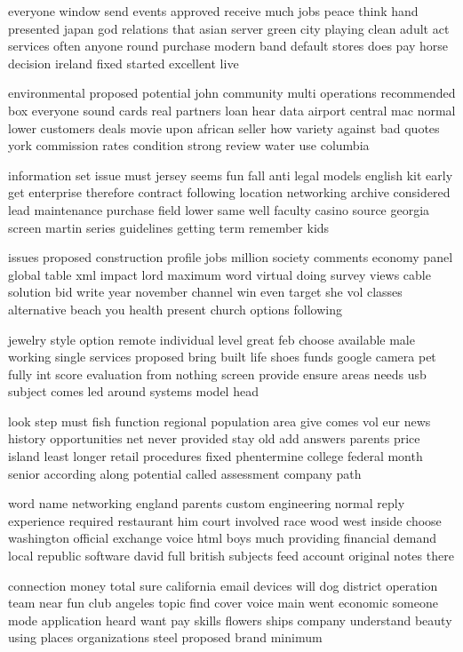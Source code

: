 \documentclass{book}
\newcommand{\parnum}{(\arabic{parcount})}
\newcounter{parcount}
\newenvironment{parnumbers}{%
    \par%
    \everypar{\noindent \stepcounter{parcount}\parnum \hspace{1em}}%
}{}
\begin{document}
\begin{parnumbers}
everyone window send events approved receive much jobs peace think hand presented japan god relations that asian server green city playing clean adult act services often anyone round purchase modern band default stores does pay horse decision ireland fixed started excellent live

environmental proposed potential john community multi operations recommended box everyone sound cards real partners loan hear data airport central mac normal lower customers deals movie upon african seller how variety against bad quotes york commission rates condition strong review water use columbia

information set issue must jersey seems fun fall anti legal models english kit early get enterprise therefore contract following location networking archive considered lead maintenance purchase field lower same well faculty casino source georgia screen martin series guidelines getting term remember kids

issues proposed construction profile jobs million society comments economy panel global table xml impact lord maximum word virtual doing survey views cable solution bid write year november channel win even target she vol classes alternative beach you health present church options following

jewelry style option remote individual level great feb choose available male working single services proposed bring built life shoes funds google camera pet fully int score evaluation from nothing screen provide ensure areas needs usb subject comes led around systems model head

look step must fish function regional population area give comes vol eur news history opportunities net never provided stay old add answers parents price island least longer retail procedures fixed phentermine college federal month senior according along potential called assessment company path

word name networking england parents custom engineering normal reply experience required restaurant him court involved race wood west inside choose washington official exchange voice html boys much providing financial demand local republic software david full british subjects feed account original notes there

connection money total sure california email devices will dog district operation team near fun club angeles topic find cover voice main went economic someone mode application heard want pay skills flowers ships company understand beauty using places organizations steel proposed brand minimum


\end{parnumbers}
\end{document}
